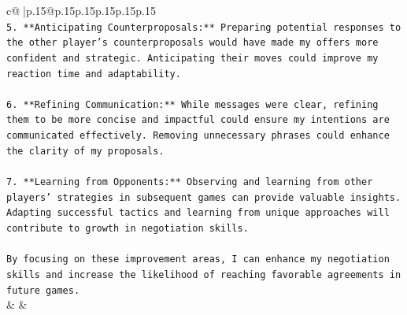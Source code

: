 \documentclass{article}
\begin{document}
{\begin{supertabular}{c@{$\;$}|p{.15\linewidth}@{}p{.15\linewidth}p{.15\linewidth}p{.15\linewidth}p{.15\linewidth}p{.15\linewidth}}
{{{\\ 
\texttt{5. **Anticipating Counterproposals:** Preparing potential responses to the other player's counterproposals would have made my offers more confident and strategic. Anticipating their moves could improve my reaction time and adaptability.} \\
\\ 
\texttt{6. **Refining Communication:** While messages were clear, refining them to be more concise and impactful could ensure my intentions are communicated effectively. Removing unnecessary phrases could enhance the clarity of my proposals.} \\
\\ 
\texttt{7. **Learning from Opponents:** Observing and learning from other players' strategies in subsequent games can provide valuable insights. Adapting successful tactics and learning from unique approaches will contribute to growth in negotiation skills.} \\
\\ 
\texttt{By focusing on these improvement areas, I can enhance my negotiation skills and increase the likelihood of reaching favorable agreements in future games.} \\
            }
        }
    }
    & & \\ \\


\end{supertabular}}
\end{document}
